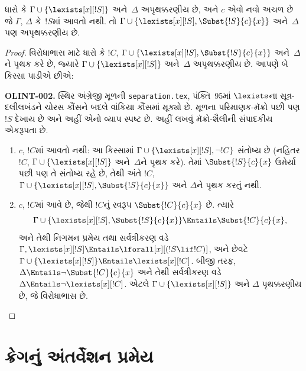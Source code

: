 \begin{lem}
ધારો કે $\Gamma \cup \{ \lexists[x][!S] \}$ અને~$\Delta$
અપૃથક્કરણીય છે, અને $c$ એવો નવો અચળ છે જે $\Gamma$,
$\Delta$ કે~$!S$માં આવતો નથી. તો $\Gamma \cup \{ \lexists[x][!S],
\Subst{!S}{c}{x} \}$ અને~$\Delta$ પણ અપૃથક્કરણીય છે.
\end{lem}

\begin{proof}
વિરોધાભાસ માટે ધારો કે $!C$, $\Gamma \cup \{ \lexists[x][!S],
\Subst{!S}{c}{x}\}$ અને~$\Delta$ને પૃથક કરે છે, જ્યારે $\Gamma \cup
\{\lexists[x][!S] \}$ અને~$\Delta$ અપૃથક્કરણીય છે. આપણે બે કિસ્સા
પાડીએ છીએ:
\begin{editorial}
\textbf{OLINT-002.} સ્થિર અંગ્રેજી મૂળની \texttt{separation.tex}, પંક્તિ~95માં $\lexists$ના સૂત્ર-દલીલખંડને ચોરસ કૌંસને બદલે વાંકિયા કૌંસમાં મૂક્યો છે. મૂળના પરિમાણક-મૅક્રો પછી પણ $!S$ દેખાય છે અને અહીં એનો વ્યાપ સ્પષ્ટ છે. અહીં \texttt{\string\lexists[x][!S]} લખવું મૅક્રો-શૈલીની સંપાદકીય એકરૂપતા છે.
\end{editorial}
\begin{enumerate}
\item $c$, $!C$માં આવતો નથી: આ કિસ્સામાં $\Gamma \cup
  \{\lexists[x][!S], \lnot!C \}$ સંતોષ્ય છે (નહિતર $!C$, $\Gamma
  \cup \{\lexists[x][!S] \}$ અને~$\Delta$ને પૃથક કરે). તેમાં
  $\Subst{!S}{c}{x}$ ઉમેર્યા પછી પણ તે સંતોષ્ય રહે છે, તેથી અંતે
  $!C$, $\Gamma \cup \{ \lexists[x][!S], \Subst{!S}{c}{x} \}$ અને
  $\Delta$ને પૃથક કરતું નથી.
\item $c$, $!C$માં આવે છે, જેથી $!C$નું સ્વરૂપ
  $\Subst{!C}{c}{x}$ છે. ત્યારે
  \[
  \Gamma \cup \{ \lexists[x][!S], \Subst{!S}{c}{x}\} \Entails \Subst{!C}{c}{x},
  \]
  અને તેથી નિગમન પ્રમેય તથા સર્વત્રીકરણ વડે
  $\Gamma, \lexists[x][!S] \Entails \lforall[x][(!S \lif !C)]$,
  અને છેવટે $\Gamma \cup \{ \lexists[x][!S] \} \Entails
  \lexists[x][!C]$. બીજી તરફ, $\Delta \Entails \lnot
  \Subst{!C}{c}{x}$ અને તેથી સર્વત્રીકરણ વડે $\Delta \Entails \lnot
  \lexists[x][!C]$. એટલે $\Gamma \cup \{\lexists[x][!S] \}$ અને
  $\Delta$ પૃથક્કરણીય છે, જે વિરોધાભાસ છે.
\end{enumerate}
\end{proof}
\endgroup


\begingroup
\makeatletter{}\makeatother


\section{ક્રેગનું અંતર્વેશન પ્રમેય}
\label{guunit:OLP-0201}


